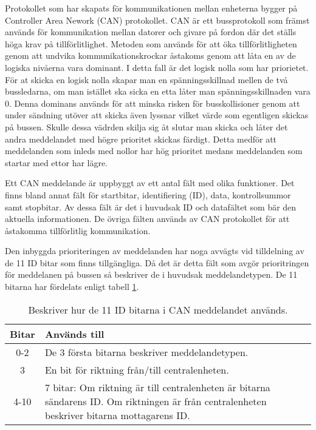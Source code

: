 Protokollet som har skapats för kommunikationen mellan enheterna bygger på Controller Area Nework (CAN) protokollet. CAN är ett bussprotokoll som främst används för kommunikation mellan datorer och givare på fordon där det ställs höga krav på tillförlitlighet. Metoden som används för att öka tillförlitligheten genom att undvika kommunikationskrockar åstakoms genom att låta en av de logiska nivåerna vara dominant. I detta fall är det logisk nolla som har priorietet. För at skicka en logisk nolla skapar man en spänningsskillnad mellen de två bussledarna, om man istället ska sicka en etta låter man spänningsskillnaden vara 0. Denna dominans används för att minska risken för busskollisioner genom att under sändning utöver att skicka även lyssnar vilket värde som egentligen skickas på bussen. Skulle dessa vädrden skilja sig åt slutar man skicka och låter det andra meddelandet med högre prioritet skickas färdigt. Detta medför att meddelanden som inleds med nollor har hög prioritet medans meddelanden som startar med ettor har lägre.

Ett CAN meddelande är uppbyggt av ett antal fält med olika funktioner. Det finns bland annat fält för startbitar, identifiering (ID), data, kontrollsummor samt stopbitar. Av dessa fält är det i huvudsak ID och datafältet som bär den aktuella informationen. De övriga fälten används av CAN protokollet för att åstakomma tillförlitlig kommunikation.

Den inbyggda prioriteringen av meddelanden har noga avvägts vid tilldelning av de 11 ID bitar som finns tillgängliga. Då det är detta fält som avgör prioritringen för meddelanen på bussen så beskriver de i huvudsak meddelandetypen. De 11 bitarna har fördelats enligt tabell \ref{tab:idbitar}.

\begin{table}[H]
	\centering
	\begin{tabular}{|c|p{}|}
		\hline
		Bitar 	& Används till \\ \hline \hline
		0-2		& De 3 första bitarna beskriver meddelandetypen. \\ \hline
		3		& En bit för riktning från/till centralenheten. \\ \hline
		4-10	& 7 bitar:
		Om riktning är till centralenheten är bitarna sändarens ID.
		Om riktningen är från centralenheten beskriver bitarna mottagarens ID. \\ \hline

	\end{tabular}
	\caption{Beskriver hur de 11 ID bitarna i CAN meddelandet används.}
	\label{tab:idbitar}
\end{table}


